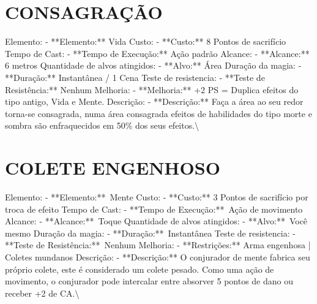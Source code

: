 \documentclass{article}%
\begin{document}
%
\section{CONSAGRAÇÃO}%
\label{sec:CONSAGRAO}%
Elemento: {-} **Elemento:** Vida\newline%
Custo: {-} **Custo:** 8 Pontos de sacrifício\newline%
Tempo de Cast: {-} **Tempo de Execução:** Ação padrão\newline%
Alcance: {-} **Alcance:** 6 metros\newline%
Quantidade de alvos atingidos: {-} **Alvo:** Área\newline%
Duração da magia: {-} **Duração:** Instantânea / 1 Cena\newline%
Teste de resistencia: {-} **Teste de Resistência:** Nenhum\newline%
Melhoria: {-} **Melhoria:** +2 PS = Duplica efeitos do tipo antigo, Vida e Mente.\newline%
Descrição: {-} **Descrição:** Faça a área ao seu redor torna{-}se consagrada, numa área consagrada efeitos de habilidades do tipo morte e sombra são enfraquecidos em 50\% dos seus efeitos.\textbackslash{}

%
\section{COLETE ENGENHOSO}%
\label{sec:COLETEENGENHOSO}%
Elemento: {-} **Elemento:**~Mente\newline%
Custo: {-} **Custo:** 3 Pontos de sacrifício por troca de efeito\newline%
Tempo de Cast: {-} **Tempo de Execução:**~Ação de movimento\newline%
Alcance: {-} **Alcance:**~Toque\newline%
Quantidade de alvos atingidos: {-} **Alvo:**~Você mesmo\newline%
Duração da magia: {-} **Duração:**~Instantânea\newline%
Teste de resistencia: {-} **Teste de Resistência:**~Nenhum\newline%
Melhoria: {-} **Restrições:** Arma engenhosa | Coletes mundanos\newline%
Descrição: {-} **Descrição:** O conjurador de mente fabrica seu próprio colete, este é considerado um colete pesado. Como uma ação de movimento, o conjurador pode intercalar entre absorver 5 pontos de dano ou receber +2 de CA.\textbackslash{}

%
\end{document}
